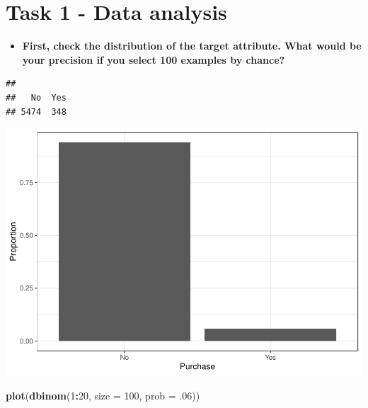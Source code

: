 \documentclass[
  12pt,
  oneside]{report}
\newenvironment{Shaded}{\begin{snugshade}}{\end{snugshade}}
\newcommand{\DataTypeTok}[1]{\textcolor[rgb]{0.13,0.29,0.53}{#1}}
\newcommand{\DecValTok}[1]{\textcolor[rgb]{0.00,0.00,0.81}{#1}}
\newcommand{\FloatTok}[1]{\textcolor[rgb]{0.00,0.00,0.81}{#1}}
\newcommand{\KeywordTok}[1]{\textcolor[rgb]{0.13,0.29,0.53}{\textbf{#1}}}
\newcommand{\NormalTok}[1]{#1}
\newcommand{\OperatorTok}[1]{\textcolor[rgb]{0.81,0.36,0.00}{\textbf{#1}}}
\providecommand{\tightlist}{%
  \setlength{\itemsep}{0pt}\setlength{\parskip}{0pt}}
\begin{document}
\hypertarget{task-1---data-analysis}{%
\chapter{Task 1 - Data analysis}\label{task-1---data-analysis}}

\begin{itemize}
\tightlist
\item
  \textbf{First, check the distribution of the target attribute. What would be your precision if you select 100 examples by chance?}
\end{itemize}

\begin{Shaded}
\end{Shaded}

\begin{verbatim}
## 
##   No  Yes 
## 5474  348
\end{verbatim}

\includegraphics{leroy_francois_hw2_files/figure-latex/unnamed-chunk-5-1.pdf}

\begin{Shaded}
\begin{Highlighting}[]
\KeywordTok{plot}\NormalTok{(}\KeywordTok{dbinom}\NormalTok{(}\DecValTok{1}\OperatorTok{:}\DecValTok{20}\NormalTok{, }\DataTypeTok{size =} \DecValTok{100}\NormalTok{, }\DataTypeTok{prob =} \FloatTok{.06}\NormalTok{))}
\end{Highlighting}
\end{Shaded}
\end{document}
